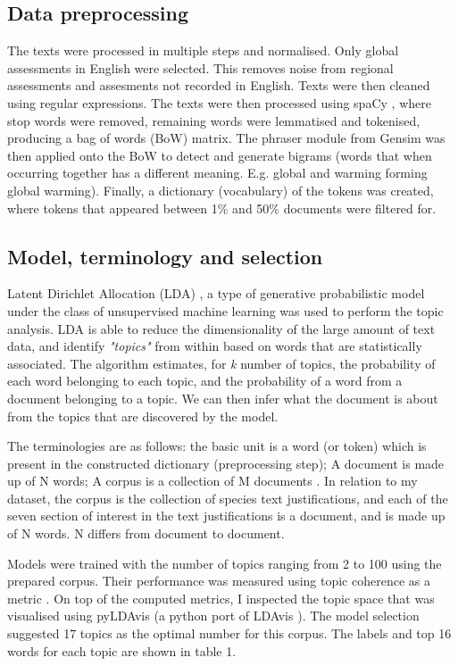 \subsection{Data preprocessing}

The texts were processed in multiple steps and normalised. Only global assessments in English were selected. This removes noise from regional assessments and assesments not recorded in English. Texts were then cleaned using regular expressions. The texts were then processed using spaCy \parencite{spacy}, where stop words were removed, remaining words were lemmatised and tokenised, producing a bag of words (BoW) matrix. The phraser module from Gensim \parencite{rehurek_lrec} was then applied onto the BoW to detect and generate bigrams (words that when occurring together has a different meaning. E.g. global and warming forming global warming). Finally, a dictionary (vocabulary) of the tokens was created, where tokens that appeared between 1\% and 50\% documents were filtered for. 

\subsection{Model, terminology and selection}

Latent Dirichlet Allocation (LDA) \parencite{blei2003latent}, a type of generative probabilistic model under the class of unsupervised machine learning was used to perform the topic analysis. LDA is able to reduce the dimensionality of the large amount of text data, and identify \textit{"topics"} from within based on words that are statistically associated. The algorithm estimates, for \textit{k} number of topics, the probability of each word belonging to each topic, and the probability of a word from a document belonging to a topic. We can then infer what the document is about from the topics that are discovered by the model. 

The terminologies are as follows: the basic unit is a word (or token) which is present in the constructed dictionary (preprocessing step); A document is made up of N words; A corpus is a collection of M documents \parencite{blei2003latent}. In relation to my dataset, the corpus is the collection of species text justifications, and each of the seven section of interest in the text justifications is a document, and is made up of N words. N differs from document to document.

Models were trained with the number of topics ranging from 2 to 100 using the prepared corpus. Their performance was measured using topic coherence as a metric \parencite{roder2015exploring}. On top of the computed metrics, I inspected the topic space that was visualised using pyLDAvis (a python port of LDAvis \parencite{sievert2014ldavis}). The model selection suggested 17 topics as the optimal number for this corpus. The labels and top 16 words for each topic are shown in table 1.

